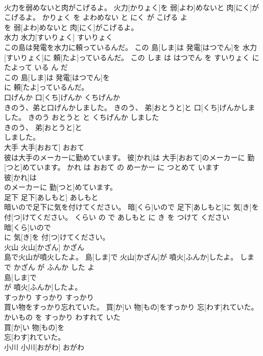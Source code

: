 \documentclass[8pt]{extreport}
\begin{document}
\begin{CJK}{UTF8}{min}
\\	火力を弱めないと肉がこげるよ。	火力[かりょく]を 弱[よわ]めないと 肉[にく]がこげるよ。	かりょく を よわめない と にく が こげる よ	
\\	を 弱[よわ]めないと 肉[にく]がこげるよ。			
\\	水力	水力[すいりょく]	すいりょく	
\\	この島は発電を水力に頼っているんだ。	この 島[しま]は 発電[はつでん]を 水力[すいりょく]に 頼[たよ]っているんだ。	この しま は はつでん を すいりょく に たよって いる ん だ	
\\	この 島[しま]は 発電[はつでん]を
\\	に 頼[たよ]っているんだ。			
\\	口げんか	口[くち]げんか	くちげんか	
\\	きのう、弟と口げんかしました。	きのう、 弟[おとうと]と 口[くち]げんかしました。	きのう おとうと と くちげんか しました	
\\	きのう、 弟[おとうと]と
\\	しました。			
\\	大手	大手[おおて]	おおて	
\\	彼は大手のメーカーに勤めています。	彼[かれ]は 大手[おおて]のメーカーに 勤[つと]めています。	かれ は おおて の めーかー に つとめて います	
\\	彼[かれ]は
\\	のメーカーに 勤[つと]めています。			
\\	足下	足下[あしもと]	あしもと	
\\	暗いので足下に気を付けてください。	暗[くら]いので 足下[あしもと]に 気[き]を 付[つ]けてください。	くらい の で あしもと に き を つけて ください	
\\	暗[くら]いので
\\	に 気[き]を 付[つ]けてください。			
\\	火山	火山[かざん]	かざん	
\\	島で火山が噴火したよ。	島[しま]で 火山[かざん]が 噴火[ふんか]したよ。	しま で かざん が ふんか した よ	
\\	島[しま]で
\\	が 噴火[ふんか]したよ。			
\\	すっかり	すっかり	すっかり	
\\	買い物をすっかり忘れていた。	買[か]い 物[もの]をすっかり 忘[わす]れていた。	かいもの を すっかり わすれて いた	
\\	買[か]い 物[もの]を
\\	忘[わす]れていた。			
\\	小川	小川[おがわ]	おがわ	

\end{CJK}
\end{document}

